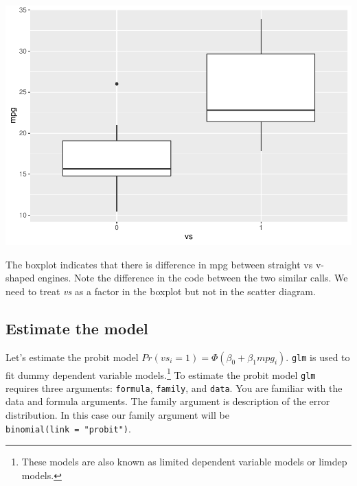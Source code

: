 \documentclass[]{book}
\newenvironment{Shaded}{\begin{snugshade}}{\end{snugshade}}
\newcommand{\DataTypeTok}[1]{\textcolor[rgb]{0.13,0.29,0.53}{#1}}
\newcommand{\KeywordTok}[1]{\textcolor[rgb]{0.13,0.29,0.53}{\textbf{#1}}}
\newcommand{\NormalTok}[1]{#1}
\newcommand{\OperatorTok}[1]{\textcolor[rgb]{0.81,0.36,0.00}{\textbf{#1}}}
\newcommand{\StringTok}[1]{\textcolor[rgb]{0.31,0.60,0.02}{#1}}
\let\rmarkdownfootnote\footnote%
\def\footnote{\protect\rmarkdownfootnote}
\begin{document}
\includegraphics{bailey_files/figure-latex/unnamed-chunk-125-2.pdf}

The boxplot indicates that there is difference in mpg between straight vs v-shaped engines. Note the difference in the code between the two similar calls. We need to treat \emph{vs} as a factor in the boxplot but not in the scatter diagram.

\hypertarget{estimate-the-model}{%
\subsection{Estimate the model}\label{estimate-the-model}}

Let's estimate the probit model \(Pr(vs_i=1)=\Phi(\beta_0+\beta_1mpg_i)\). \texttt{glm} is used to fit dummy dependent variable models.\footnote{These models are also known as limited dependent variable models or limdep models.} To estimate the probit model \texttt{glm} requires three arguments: \texttt{formula}, \texttt{family}, and \texttt{data}. You are familiar with the data and formula arguments. The family argument is description of the error distribution. In this case our family argument will be \texttt{binomial(link\ =\ "probit")}.

\begin{Shaded}
\end{Shaded}
\end{document}
